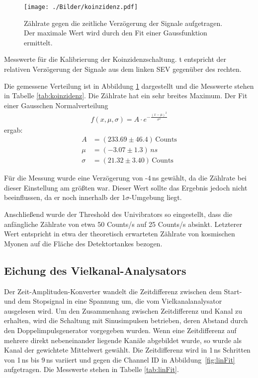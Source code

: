 \begin{figure}[htbp]
	\texttt{[image: ./Bilder/koinzidenz.pdf]}
	\caption{Zählrate gegen die zeitliche Verzögerung der Signale aufgetragen. Der maximale Wert wird durch den Fit einer Gaussfunktion ermittelt.}
	\label{fig:koinzidenz}
\end{figure}

\begin{table}[htbp]
	
	\caption{Messwerte für die Kalibrierung der Koinzidenzschaltung. t entspricht der relativen Verzögerung der Signale aus dem linken SEV gegenüber des rechten.}
	\label{tab:koinzidenz}
\end{table}

Die gemessene Verteilung ist in Abbildung \ref{fig:koinzidenz} dargestellt und die Messwerte stehen in Tabelle \ref{tab:koinzidenz}. Die Zählrate hat ein sehr breites Maximum. Der Fit einer Gausschen Normalverteilung
\begin{align}
	f(x,\mu,\sigma) = A\cdot e^{-\frac{(x-\mu)^2}{\sigma^2}}
\end{align}
ergab:
\begin{align}
A &= (233.69 \pm 46.4)\,\text{Counts}\\
\mu &= (-3.07 \pm 1.3)\,\si{ns}\\
\sigma &= ({21.32} \pm 3.40)\,\si{\text{Counts}}
\end{align}

Für die Messung wurde eine Verzögerung von -4\,\si{ns} gewählt, da die Zählrate bei dieser Einstellung am größten war. Dieser Wert sollte das Ergebnis jedoch nicht beeinflussen, da er noch innerhalb der 1$\sigma$-Umgebung liegt.

Anschließend wurde der Threshold des Univibrators so eingestellt, dass die anfängliche Zählrate von etwa 50 Counts/s auf 25 Counts/s absinkt. Letzterer Wert entspricht in etwa der theoretisch erwarteten Zählrate von kosmischen Myonen auf die Fläche des Detektortankes bezogen.

\subsection{Eichung des Vielkanal-Analysators}
Der Zeit-Amplituden-Konverter wandelt die Zeitdifferenz zwischen dem Start- und dem Stopsignal in eine Spannung um, die vom Vielkanalanalysator ausgelesen wird. Um den Zusammenhang zwischen Zeitdifferenz und Kanal zu erhalten, wird die Schaltung mit Sinusimpulsen betrieben, deren Abstand durch den Doppelimpulsgenerator vorgegeben wurden. Wenn eine Zeitdifferenz auf mehrere direkt nebeneinander liegende Kanäle abgebildet wurde, so wurde als Kanal der gewichtete Mittelwert gewählt. Die Zeitdifferenz wird in 1\,\si{ns} Schritten von 1\,ns bis 9\,ns variiert und gegen die Channel ID in \mbox{Abbildung \ref{fig:linFit}} aufgetragen. Die Messwerte stehen in Tabelle \ref{tab:linFit}.

